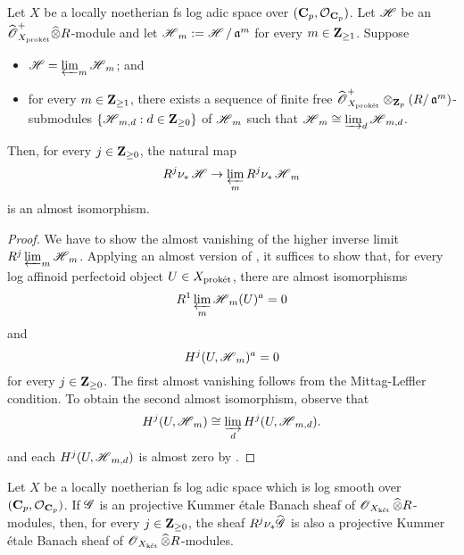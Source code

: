 \begin{Lemma}\label{Lemma: proj. formula lemma 1}
Let $X$ be a locally noetherian fs log adic space over $(\C_p, \calO_{\C_p})$. Let $\scrH$ be an $\widehat{\scrO}_{X_{\proket}}^+ \widehat{\otimes} R$-module and let $\scrH_m:= \scrH/\fraka^m$ for every $m\in \Z_{\geq 1}$. Suppose 
\begin{itemize}
    \item $\scrH = \varprojlim_m \scrH_m$; and
    \item for every $m\in \Z_{\geq 1}$, there exists a sequence of finite free $\widehat{\scrO}_{X_{\proket}}^+\otimes_{\Z_p} (R/\fraka^m)$-submodules $\{\scrH_{m, d}: d\in \Z_{\geq 0}\}$ of $\scrH_m$ such that $\scrH_m\cong \varinjlim_d \scrH_{m,d}$.
\end{itemize}
   Then, for every $j\in \Z_{\geq 0}$, the natural map \[
    R^j\nu_{*}\scrH \rightarrow \varprojlim_m R^j\nu_{*} \scrH_{m}
\] is an almost isomorphism.
\end{Lemma}
\begin{proof}
We have to show the almost vanishing of the higher inverse limit $R^j\varprojlim_{m}\scrH_m$. Applying an almost version of \cite[Lemma 3.18]{Scholze_2013}, it suffices to show that, for every log affinoid perfectoid object $U\in X_{\proket}$, there are almost isomorphisms 
$$R^1\varprojlim_{m} \scrH_m(U)^a = 0 
$$
and 
$$ H^j(U, \scrH_m)^a = 0$$
for every $j\in \Z_{\geq 0}$. The first almost vanishing follows from the Mittag-Leffler condition. To obtain the second almost isomorphism, observe that \[
    H^j(U, \scrH_m) \cong \varinjlim_{d} H^j(U, \scrH_{m, d}).
\] and each $H^j(U, \scrH_{m, d})$ is almost zero by \cite[Theorem 5.4.3]{Diao}.
\end{proof}

\begin{Lemma}\label{Lemma: proj. formula lemma 2}
Let $X$ be a locally noetherian fs log adic space which is log smooth over $(\C_p, \calO_{\C_p})$. If $\scrG$ is an projective Kummer \'etale Banach sheaf of $\scrO_{X_{\ket}}\widehat{\otimes}R$-modules, then, for every $j\in \Z_{\geq 0}$, the sheaf $R^j\nu_*\widehat{\scrG}$ is also a projective Kummer \'etale Banach sheaf of $\scrO_{X_{\ket}}\widehat{\otimes}R$-modules.
\end{Lemma}

